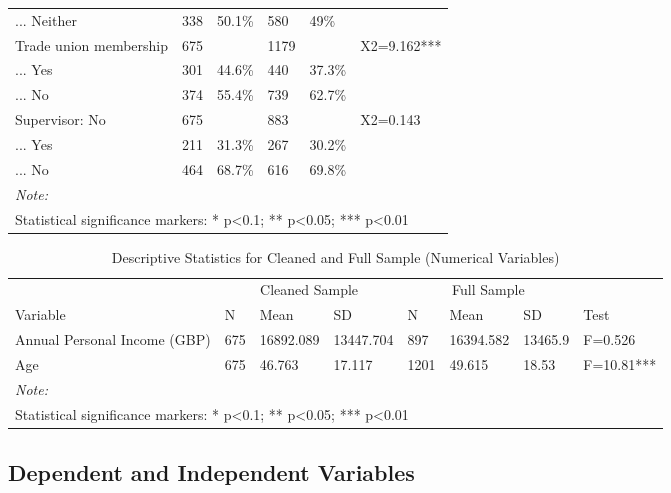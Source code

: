 \documentclass[
]{article}
\begin{document}
\begin{table}[H]
\begin{tabular}[t]{llllll}
\addlinespace
... Neither & 338 & 50.1\% & 580 & 49\% & \\
Trade union membership & 675 &  & 1179 &  & X2=9.162***\\
... Yes & 301 & 44.6\% & 440 & 37.3\% & \\
... No & 374 & 55.4\% & 739 & 62.7\% & \\
Supervisor: No & 675 &  & 883 &  & X2=0.143\\
\addlinespace
... Yes & 211 & 31.3\% & 267 & 30.2\% & \\
... No & 464 & 68.7\% & 616 & 69.8\% & \\
\bottomrule
\multicolumn{6}{l}{\rule{0pt}{1em}\textit{Note: }}\\
\multicolumn{6}{l}{\rule{0pt}{1em}Statistical significance markers: * p<0.1; ** p<0.05; *** p<0.01}\\
\end{tabular}
\end{table}

\begin{table}[H]

\caption{\label{tab:unnamed-chunk-1}Descriptive Statistics for Cleaned and Full Sample (Numerical Variables)}
\centering
\begin{tabular}[t]{llllllll}
\toprule
\multicolumn{1}{c}{ } & \multicolumn{3}{c}{Cleaned Sample} & \multicolumn{3}{c}{Full Sample} & \multicolumn{1}{c}{ } \\
\cmidrule(l{3pt}r{3pt}){2-4} \cmidrule(l{3pt}r{3pt}){5-7}
Variable & N & Mean & SD & N & Mean & SD & Test\\
\midrule
Annual Personal Income (GBP) & 675 & 16892.089 & 13447.704 & 897 & 16394.582 & 13465.9 & F=0.526\\
Age & 675 & 46.763 & 17.117 & 1201 & 49.615 & 18.53 & F=10.81***\\
\bottomrule
\multicolumn{8}{l}{\rule{0pt}{1em}\textit{Note: }}\\
\multicolumn{8}{l}{\rule{0pt}{1em}Statistical significance markers: * p<0.1; ** p<0.05; *** p<0.01}\\
\end{tabular}
\end{table}

\hypertarget{dependent-and-independent-variables}{%
\subsection{Dependent and Independent
Variables}\label{dependent-and-independent-variables}}
\end{document}
